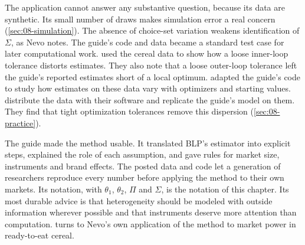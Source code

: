 The application cannot answer any substantive question, because its data are synthetic. Its small number
of draws makes simulation error a real concern (\cref{sec:08-simulation}). The absence of choice-set
variation weakens identification of $\Sigma$, as Nevo notes. The guide's code and data became a standard
test case for later computational work. \citet[Section~6.2]{DubeFoxSu2012} used the cereal data to show how a
loose inner-loop tolerance distorts estimates. They also note that a loose outer-loop tolerance left the guide's
reported estimates short of a local optimum. \citet[p.~39]{KnittelMetaxoglou2014} adapted the
guide's code to study how estimates on these data vary with optimizers and starting values.
\citet[Section~6]{ConlonGortmaker2020} distribute the data with their software and replicate the guide's model on
them. They find that tight optimization tolerances remove this dispersion (\cref{sec:08-practice}).

The guide made the method usable. It translated BLP's estimator into explicit steps, explained the role
of each assumption, and gave rules for market size, instruments and brand effects. The posted data and
code let a generation of researchers reproduce every number before applying the method to their own
markets. Its notation, with $\theta_1$, $\theta_2$, $\Pi$ and $\Sigma$, is the notation of this chapter.
Its most durable advice is that heterogeneity should be modeled with outside information wherever possible
and that instruments deserve more attention than computation.  turns to Nevo's own
application of the method to market power in ready-to-eat cereal.

